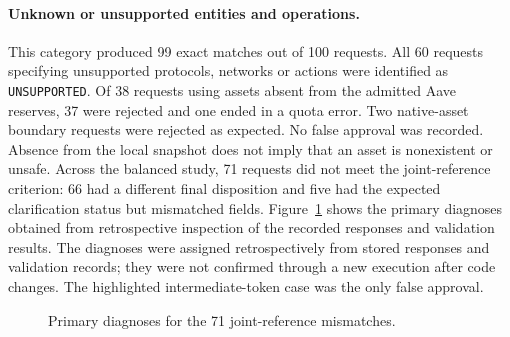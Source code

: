 \paragraph{Unknown or unsupported entities and operations.}
This category produced 99 exact matches out of 100 requests. All 60 requests
specifying unsupported protocols, networks or actions were identified as
\texttt{UNSUPPORTED}. Of 38 requests using assets absent from the admitted
Aave reserves, 37 were rejected and one ended in a quota error. Two
native-asset boundary requests were rejected as expected. No false
approval was recorded. Absence from the local snapshot does not imply
that an asset is nonexistent or unsafe. Across the balanced study, 71 requests did not meet the joint-reference
criterion: 66 had a different final disposition and five had the expected
clarification status but mismatched fields. Figure~\ref{fig:results_errors}
shows the primary diagnoses obtained from retrospective inspection of the
recorded responses and validation results. The diagnoses were assigned retrospectively from stored responses and validation
records; they were not confirmed through a new execution after code changes.  The highlighted intermediate-token case was the only false approval.

\begin{figure}[H]
\centering
{}
\caption{Primary diagnoses for the 71 joint-reference mismatches.}
\label{fig:results_errors}
\end{figure}

